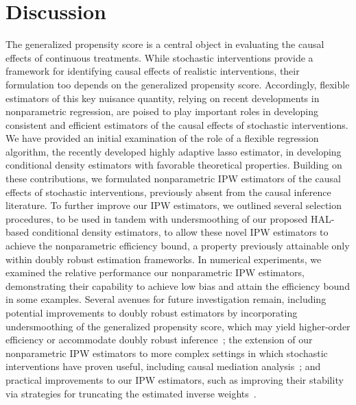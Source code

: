 \section{Discussion}\label{discuss}

The generalized propensity score is a central object in evaluating the causal
effects of continuous treatments. While stochastic interventions provide
a framework for identifying causal effects of realistic interventions, their
formulation too depends on the generalized propensity score. Accordingly,
flexible estimators of this key nuisance quantity, relying on recent
developments in nonparametric regression, are poised to play important roles in
developing consistent and efficient estimators of the causal effects of
stochastic interventions. We have provided an initial examination of the role of
a flexible regression algorithm, the recently developed highly adaptive lasso
estimator, in developing conditional density estimators with favorable
theoretical properties. Building on these contributions, we formulated
nonparametric IPW estimators of the causal effects of stochastic interventions,
previously absent from the causal inference literature. To further improve our
IPW estimators, we outlined several selection procedures, to be used in tandem
with undersmoothing of our proposed HAL-based conditional density estimators, to
allow these novel IPW estimators to achieve the nonparametric efficiency bound,
a property previously attainable only within doubly robust estimation
frameworks. In numerical experiments, we examined the relative performance our
nonparametric IPW estimators, demonstrating their capability to achieve low bias
and attain the efficiency bound in some examples. Several avenues for future
investigation remain, including potential improvements to doubly robust
estimators by incorporating undersmoothing of the generalized propensity score,
which may yield higher-order efficiency or accommodate doubly robust
inference~\citep[e.g.,][]{benkeser2017doubly}; the extension of our
nonparametric IPW estimators to more complex settings in which stochastic
interventions have proven useful, including causal mediation
analysis~\citep[e.g.,][]{diaz2020causal}; and practical improvements to our
IPW estimators, such as improving their stability via strategies for truncating
the estimated inverse weights~\citep[e.g.,][]{bembom2008data, ju2019adaptive}.
